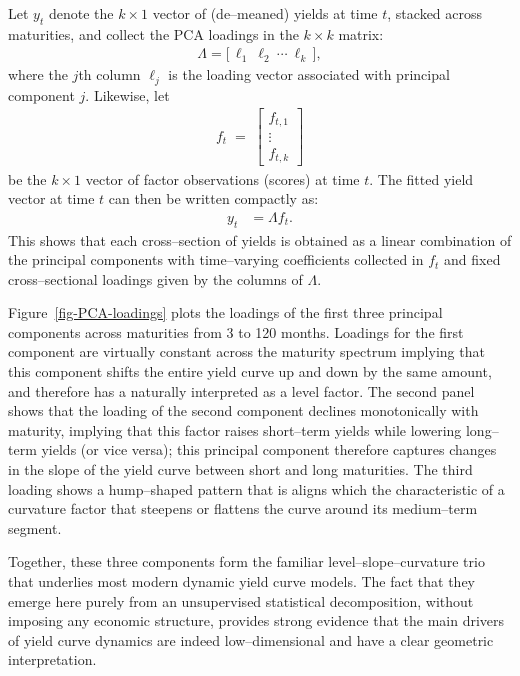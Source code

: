 \documentclass[
  letterpaper,
  DIV=11,
  numbers=noendperiod]{scrreprt}
\begin{document}
Let \(y_t\) denote the \(k\times 1\) vector of (de--meaned) yields at
time \(t\), stacked across maturities, and collect the PCA loadings in
the \(k\times k\) matrix:
\begin{align}
\Lambda = \big[\,\ell_1 \ \ell_2 \ \cdots \ \ell_k\,\big],
\end{align}
where the \(j\)th column \(\ell_j\) is the loading vector associated
with principal component \(j\). Likewise, let
\begin{align}
    f_t \;=\;
    \begin{bmatrix}
        f_{t,1} \\
        \vdots   \\
        f_{t,k}
    \end{bmatrix}
\end{align}
be the \(k\times 1\) vector of factor observations (scores) at time
\(t\). The fitted yield vector at time \(t\) can then be written
compactly as:
\begin{align}
y_t &= \Lambda f_t.
\end{align}
This shows that each cross--section of yields is obtained as a linear
combination of the principal components with time--varying coefficients
collected in \(f_t\) and fixed cross--sectional loadings given by the
columns of \(\Lambda\).

Figure~\ref{fig-PCA-loadings} plots the loadings of the first three
principal components across maturities from 3 to 120 months. Loadings
for the first component are virtually constant across the maturity
spectrum implying that this component shifts the entire yield curve up
and down by the same amount, and therefore has a naturally interpreted
as a level factor. The second panel shows that the loading of the second
component declines monotonically with maturity, implying that this
factor raises short--term yields while lowering long--term yields (or
vice versa); this principal component therefore captures changes in the
slope of the yield curve between short and long maturities. The third
loading shows a hump--shaped pattern that is aligns which the
characteristic of a curvature factor that steepens or flattens the curve
around its medium--term segment.

Together, these three components form the familiar
level--slope--curvature trio that underlies most modern dynamic yield
curve models. The fact that they emerge here purely from an unsupervised
statistical decomposition, without imposing any economic structure,
provides strong evidence that the main drivers of yield curve dynamics
are indeed low--dimensional and have a clear geometric interpretation.
\end{document}
